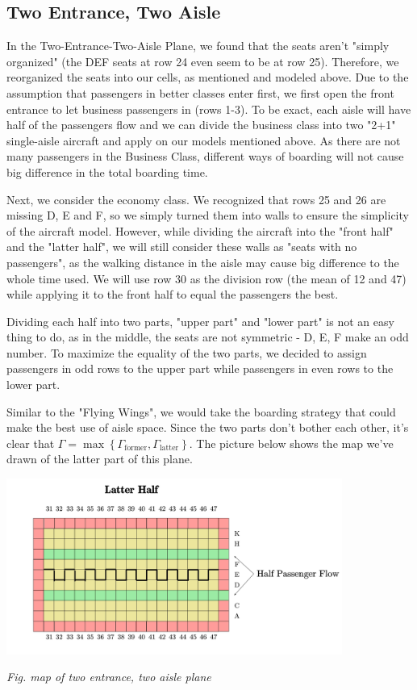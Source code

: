 \documentclass{article}
\theoremstyle{definition}
\theoremstyle{remark}
\numberwithin{equation}{section}
\begin{document}
	\subsection{Two Entrance, Two Aisle}
	In the Two-Entrance-Two-Aisle Plane, we found that the seats aren't "simply organized" (the DEF seats at row 24 even seem to be at row 25). Therefore, we reorganized the seats into our cells, as mentioned and modeled above. Due to the assumption that passengers in better classes enter first, we first open the front entrance to let business passengers in (rows 1-3). To be exact, each aisle will have half of the passengers flow and we can divide the business class into two "2+1" single-aisle aircraft and apply on our models mentioned above. As there are not many passengers in the Business Class, different ways of boarding will not cause big difference in the total boarding time.

	Next, we consider the economy class. We recognized that rows 25 and 26 are missing D, E and F, so we simply turned them into walls to ensure the simplicity of the aircraft model. However, while dividing the aircraft into the "front half" and the "latter half", we will still consider these walls as "seats with no passengers", as the walking distance in the aisle may cause big difference to the whole time used. We will use row 30 as the division row (the mean of 12 and 47) while applying it to the front half to equal the passengers the best.

	Dividing each half into two parts, "upper part" and "lower part" is not an easy thing to do, as in the middle, the seats are not symmetric - D, E, F make an odd number. To maximize the equality of the two parts, we decided to assign passengers in odd rows to the upper part while passengers in even rows to the lower part.

	Similar to the "Flying Wings", we would take the boarding strategy that could make the best use of aisle space. Since the two parts don't bother each other, it's clear that $\Gamma=\max \left\{\Gamma_\text{former}, \Gamma_\text{latter}\right\}$. The picture below shows the map we've drawn of the latter part of this plane.

	\begin{center}
		\includegraphics[width=11cm]{double.jpg}

		\small \textit{Fig. map of two entrance, two aisle plane}
	\end{center}
\end{document}
